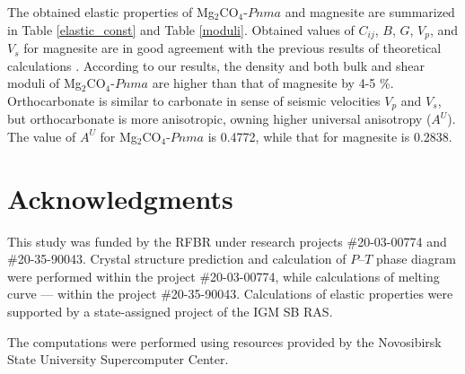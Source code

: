 \documentclass[a4paperm]{article}
\begin{document}
The obtained elastic properties of Mg$_2$CO$_4$-$Pnma$ and magnesite are summarized in Table \ref{elastic_const} and Table \ref{moduli}.
Obtained values of $C_{ij}$, $B$, $G$, $V_p$, and $V_s$ for magnesite are in good agreement with the previous results of theoretical calculations \cite{li2020_mgco3}.
According to our results, the density and both bulk and shear moduli of Mg$_2$CO$_4$-$Pnma$ are higher than that of magnesite by 4-5 \%.
Orthocarbonate is similar to carbonate in sense of seismic velocities $V_p$ and $V_s$, but orthocarbonate is more anisotropic, owning higher universal anisotropy ($A^U$).
The value of $A^U$ for Mg$_2$CO$_4$-$Pnma$ is 0.4772, while that for magnesite is 0.2838.


\section*{Acknowledgments}
This study was funded by the RFBR under research projects \#20-03-00774 and \#20-35-90043.
Crystal structure prediction and calculation of $P$--$T$ phase diagram were performed within the project \#20-03-00774, while calculations of melting curve --- within the project \#20-35-90043.
Calculations of elastic properties were supported by a state-assigned project of the IGM SB RAS. 

The computations were performed using resources provided by the Novosibirsk State University Supercomputer Center.




\end{document}
